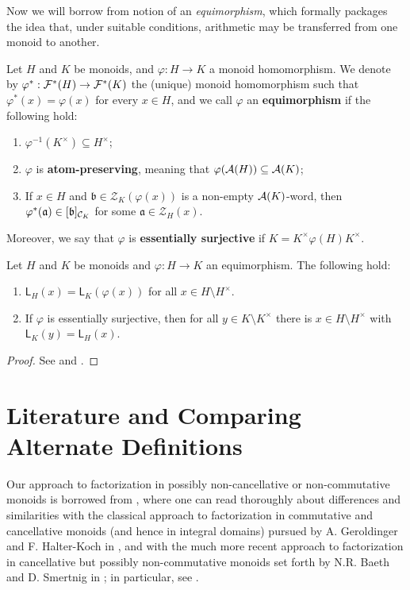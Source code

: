 Now we will borrow from \cite[Definition 3.2]{tringali18} notion of an \textit{equimorphism}, which formally packages the idea that, under suitable conditions, arithmetic may be transferred from one monoid to another.
%
\begin{defn}\label{def:equimorphism}
	Let $H$ and $K$ be monoids, and $\varphi: H\to K$ a monoid homomorphism. We denote by $\varphi^*: \mathcal{F}^*(H)\to\mathcal{F}^*(K)$ the (unique) monoid homomorphism such that $\varphi^\ast(x) = \varphi(x)$ for every $x \in H$, and we call $\varphi$ an \textbf{equimorphism} if the following hold:
	\begin{enumerate}[label={({\small{E}}\arabic{*})}]
		\item\label{def:equimorphism(E1)} $\varphi^{-1}(K^\times)\subseteq H^\times$;
		\item\label{def:equimorphism(E2)} $\varphi$ is \textbf{atom-preserving}, meaning that $\varphi(\mathcal{A}(H)) \subseteq \mathcal{A}(K)$;
		\item\label{def:equimorphism(E3)} If $x\in H$ and $\mathfrak{b}\in \mathcal{Z}_K(\varphi(x))$ is a non-empty $\mathcal{A}(K)$-word, then $\varphi^*(\mathfrak{a}) \in [ \mathfrak{b} ]_{\mathcal{C}_K}$ for some $\mathfrak{a}\in \mathcal{Z}_H(x)$.
	\end{enumerate}
	Moreover, we say that $\varphi$ is \textbf{essentially surjective} if $K = K^\times \varphi(H)K^\times$.
\end{defn}
%
\begin{prop}\label{prop:equimorphism}
	Let $H$ and $K$ be monoids and $\varphi:H\to K$ an equimorphism. The following hold:
	\begin{enumerate}[label={\rm (\roman{*})}]
		\item\label{it:prop:equimorphism(i)} $\mathsf{L}_H(x) = \mathsf{L}_K(\varphi(x))$ for all $x\in H\setminus H^\times$.
		\item\label{it:prop:equimorphism(ii)} If $\varphi$ is essentially surjective, then for all $y\in K\setminus K^\times$ there is $x\in H\setminus H^\times$ with $\mathsf{L}_K(y) = \mathsf{L}_H(x)$.
	\end{enumerate}
\end{prop}
%
\begin{proof}
	See \cite[Theorem 2.22(i)]{fan-tringali18} and \cite[Theorem 3.3(i)]{tringali18}.
\end{proof}
%

\section{Literature and Comparing Alternate Definitions} \label{sub:other-factorizations}
%
Our approach to factorization in possibly non-cancellative or non-commutative monoids is borrowed from \cite{fan-tringali18}, where one can read thoroughly about differences and similarities with 
the classical approach to factorization in commutative and cancellative monoids (and hence in integral domains) pursued by A. Geroldinger and F. Halter-Koch in \cite{geroldinger-hk06}, and with the much more recent approach to factorization in cancellative but possibly non-commutative monoids set forth by N.R. Baeth and D. Smertnig in \cite{baeth-smertnig15}; in particular, see \cite[Remarks 2.6 and 2.7]{fan-tringali18}.

